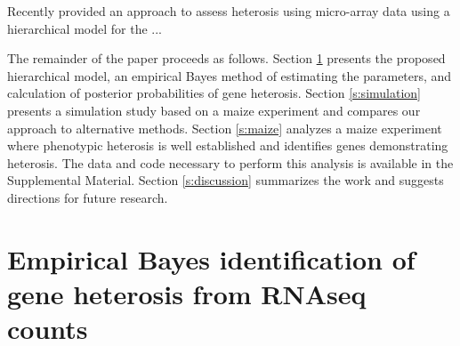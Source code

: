 \documentclass[useAMS,usenatbib,referee]{biom}
\begin{document}
Recently \citep{ji2014estimation} provided an approach to assess heterosis using micro-array data using a hierarchical model for the ...


% 
% 
% 

The remainder of the paper proceeds as follows. Section \ref{s:method} presents the proposed hierarchical model, an empirical Bayes method of estimating the parameters, and calculation of posterior probabilities of gene heterosis. Section \ref{s:simulation} presents a simulation study based on a maize experiment and compares our approach to alternative methods. Section \ref{s:maize} analyzes a maize experiment where phenotypic heterosis is well established and identifies genes demonstrating heterosis. The data and code necessary to perform this analysis is available in the Supplemental Material. Section \ref{s:discussion} summarizes the work and suggests directions for future research.


\section{Empirical Bayes identification of gene heterosis from RNAseq counts}
\label{s:method}
\end{document}
